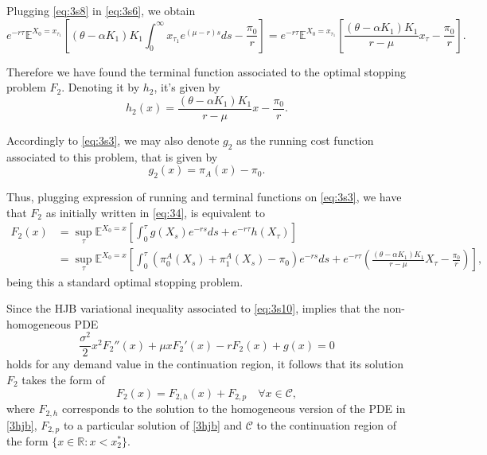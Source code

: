 Plugging \eqref{eq:3s8} in \eqref{eq:3s6}, we obtain
\begin{equation}
e^{-r\tau} \mathds{E}^{X_0=x_{\tau_1}} \left[   (\theta-\alpha K_1)K_1 \int_{0}^\infty x_{\tau_1} e^{\left( \mu-r \right)s} ds -\frac{\pi_0}{r} \right] = e^{-r\tau} \mathds{E}^{X_0=x_{\tau_1}} \left[   \frac{(\theta-\alpha K_1)K_1}{r-\mu} x_{\tau} -\frac{\pi_0}{r} \right].
\label{eq:3s9}
\end{equation}

Therefore we have found the terminal function associated to the optimal stopping problem $F_2$. Denoting it by $h_2$, it's given by
$$h_2(x)=\frac{(\theta-\alpha K_1)K_1}{r-\mu} x -\frac{\pi_0}{r}.$$

Accordingly to \eqref{eq:3s3}, we may also denote $g_2$ as the running cost function associated to this problem, that is given by
$$g_2(x)=\pi_A(x)-\pi_0.$$

Thus, plugging expression of running and terminal functions on \eqref{eq:3s3}, we have that $F_2$ as initially written in \eqref{eq:34}, is equivalent to
\begin{align}
F_2(x)&=\sup_{\tau} \mathds{E}^{X_0=x} \left[ \int_0^{\tau} g(X_s) e^{-rs}ds + e^{-r\tau}h(X_\tau)  \right]\\
&=\sup_{\tau} \mathds{E}^{X_0=x} \left[ \int_0^{\tau} \left( \pi_0^A(X_s)+\pi_1^A(X_s)-\pi_0 \right) e^{-rs}ds + e^{-r\tau} \left(   \frac{(\theta-\alpha K_1)K_1}{r-\mu} X_{\tau} -\frac{\pi_0}{r} \right)  \right],
\label{eq:3s10}
\end{align}
being this a standard optimal stopping problem.

Since the HJB variational inequality associated to \eqref{eq:3s10}, implies that the non-homogeneous PDE 
\begin{equation}
\frac{\sigma^2}{2}x^2F_2''(x)+\mu x F_2'(x) - r F_2(x)+g(x) =0 
\label{3hjb}
\end{equation}
holds for any demand value in the continuation region, it follows that its solution $F_2$ takes the form of
\begin{equation}
F_2(x)=F_{2,h}(x)+F_{2,p} \quad \forall x \in \mathcal{C},
\end{equation}
where $F_{2,h}$ corresponds to the solution to the homogeneous version of the PDE in \eqref{3hjb}, $F_{2,p}$ to a particular solution of \eqref{3hjb} and $\mathcal{C}$ to the continuation region of the form $\{ x \in \mathds{R}: x< x_2^* \}$.

